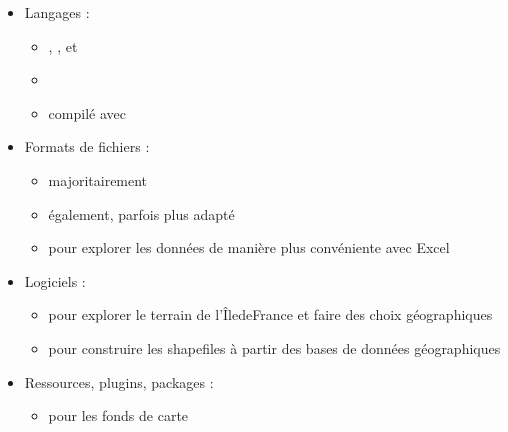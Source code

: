 \documentclass[letterpaper,10pt,french]{sphinxmanual}
\begin{document}
\begin{itemize}
\item {} 
\sphinxAtStartPar
Langages :
\begin{itemize}
\item {} 
\sphinxAtStartPar
{}, , et 

\item {} 
\sphinxAtStartPar
{}

\item {} 
\sphinxAtStartPar
{} compilé avec 

\end{itemize}

\item {} 
\sphinxAtStartPar
Formats de fichiers :
\begin{itemize}
\item {} 
\sphinxAtStartPar
{}
majoritairement

\item {} 
\sphinxAtStartPar
{} également,
parfois plus adapté

\item {} 
\sphinxAtStartPar
{}
pour explorer les données de manière plus convéniente avec Excel

\end{itemize}

\item {} 
\sphinxAtStartPar
Logiciels :
\begin{itemize}
\item {} 
\sphinxAtStartPar
{} pour explorer
le terrain de l’Île\sphinxhyphen{}de\sphinxhyphen{}France et faire des choix géographiques

\item {} 
\sphinxAtStartPar
{} pour construire les
shapefiles à partir des bases de données géographiques

\end{itemize}

\item {} 
\sphinxAtStartPar
Ressources, plugins, packages :
\begin{itemize}
\item {} 
\sphinxAtStartPar
{} pour les fonds
de carte


\end{itemize}
\end{itemize}
\end{document}
